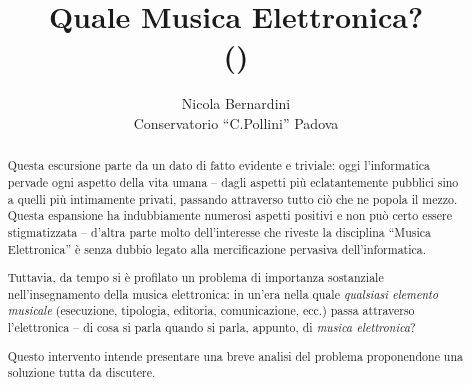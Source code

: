 \documentclass{scrartcl}
\title%
{%
  Quale Musica Elettronica?\\%
  {\tiny (\reltag)}
}
\author%
{%
  Nicola Bernardini\\
  Conservatorio ``C.Pollini'' Padova%
}%
\begin{document}
\maketitle

\begin{abstract}
  Questa escursione parte da un dato di fatto evidente e triviale: oggi
  l'informatica pervade ogni aspetto della vita umana -- dagli aspetti pi\`u
  eclatantemente pubblici sino a quelli pi\`u intimamente privati, passando
  attraverso tutto ci\`o che ne popola il mezzo. Questa espansione ha
  indubbiamente numerosi aspetti positivi e non pu\`o certo essere
  stigmatizzata -- d'altra parte molto dell'interesse che riveste la
  disciplina ``Musica Elettronica'' \`e senza dubbio legato alla
  mercificazione pervasiva dell'informatica.

  Tuttavia, da tempo si \`e profilato un problema di importanza sostanziale
  nell'insegnamento della musica elettronica: in un'era nella quale
  \emph{qualsiasi elemento musicale} (esecuzione, tipologia, editoria,
  comunicazione, ecc.) passa attraverso l'elettronica -- di cosa si parla
  quando si parla, appunto, di \emph{musica elettronica}?

  Questo intervento intende presentare una breve analisi del problema
  proponendone una soluzione tutta da discutere.
\end{abstract}
\end{document}
